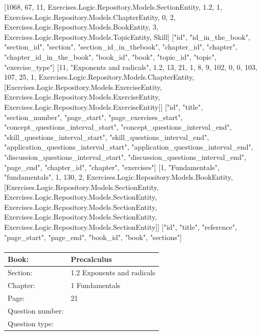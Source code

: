 \documentclass{article}
\begin{document}
    [1068, 67, 11, Exercises.Logic.Repository.Models.SectionEntity, 1.2, 1, Exercises.Logic.Repository.Models.ChapterEntity, 0, 2, Exercises.Logic.Repository.Models.BookEntity, 3, Exercises.Logic.Repository.Models.TopicEntity, Skill]
    ["id", "id_in_the_book", "section_id", "section", "section_id_in_thebook", "chapter_id", "chapter", "chapter_id_in_the_book", "book_id", "book", "topic_id", "topic", "exercise_type"]
    [11, "Exponents and radicals", 1.2, 13, 21, 1, 8, 9, 102, 0, 0, 103, 107, 25, 1, Exercises.Logic.Repository.Models.ChapterEntity, [Exercises.Logic.Repository.Models.ExerciseEntity, Exercises.Logic.Repository.Models.ExerciseEntity, Exercises.Logic.Repository.Models.ExerciseEntity]]
    ["id", "title", "section_number", "page_start", "page_exercises_start", "concept_questions_interval_start", "concept_questions_interval_end", "skill_questions_interval_start", "skill_questions_interval_end", "application_questions_interval_start", "application_questions_interval_end", "discussion_questions_interval_start", "discussion_questions_interval_end", "page_end", "chapter_id", "chapter", "exercises"]
    [1, "Fundamentals", "fundamentals", 1, 130, 2, Exercises.Logic.Repository.Models.BookEntity, [Exercises.Logic.Repository.Models.SectionEntity, Exercises.Logic.Repository.Models.SectionEntity, Exercises.Logic.Repository.Models.SectionEntity, Exercises.Logic.Repository.Models.SectionEntity, Exercises.Logic.Repository.Models.SectionEntity]]
    ["id", "title", "reference", "page_start", "page_end", "book_id", "book", "sections"]

   \paragraph{}
   \begin{tabularx}{1\textwidth}{
           p{}
           p{}
       }
       \toprule
       Book: & Precalculus
       \\
       \midrule
       Section: & 1.2 Exponents and radicals
       \\
       \midrule
       Chapter: & 1 Fundamentals
       \\
       \midrule
       Page: & 21
       \\
       \midrule
       Question number: & 
       \\
       \midrule
       Question type: & 
       \\
       \bottomrule
   \end{tabularx}
\end{document}
